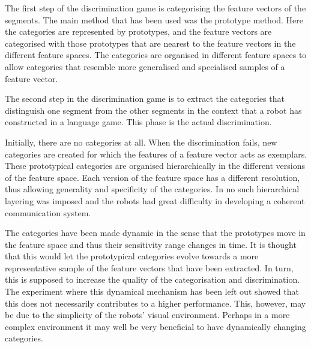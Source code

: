 The first step of the discrimination game is categorising the feature vectors of the segments. The main method that has been used was the prototype method. Here the categories are represented by prototypes, and the feature vectors are categorised with those prototypes that are nearest to the feature vectors in the different feature spaces. The categories are organised in different feature spaces to allow categories that resemble more generalised and specialised samples of a feature vector.

The second step in the discrimination game is to extract the categories that distinguish one segment from the other segments in the context that a robot has constructed in a language game. This phase is the actual discrimination.

Initially, there are no categories at all. When the discrimination fails, new categories are created for which the features of a feature vector acts as exemplars. These prototypical categories are organised hierarchically in the different versions of the feature space. Each version of the feature space has a different resolution, thus allowing generality and specificity of the categories. In \citealt{dejongvogt:1998} no such hierarchical layering was imposed and the robots had great difficulty in developing a coherent communication system. 


The categories have been made dynamic in the sense that the prototypes move in the feature space and thus their sensitivity range changes in time. It is thought that this would let the prototypical categories evolve towards a more representative sample of the feature vectors that have been extracted. In turn, this is supposed to increase the quality of the categorisation and discrimination. The experiment where this dynamical mechanism has been left out showed that this does not necessarily contributes to a higher performance. This, however, may be due to the simplicity of the robots' visual environment. Perhaps in a more complex environment it may well be very beneficial to have dynamically changing categories.

